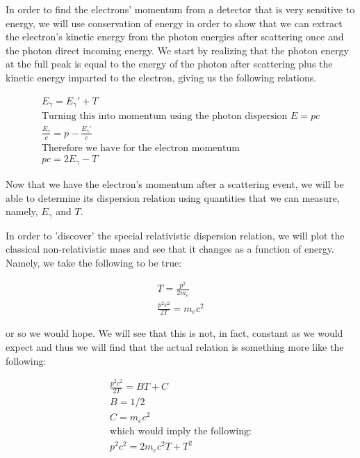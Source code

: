 \documentclass[reprint, nobibnotes, amssymb, amsmath, amsfonts, physics, mathtools, mathrsfs, floatfix]{revtex4-1}
\begin{document}
    In order to find the electrons' momentum from a detector that is very sensitive to energy, we will use conservation of energy in order to show that we can extract the electron's kinetic energy from the photon energies after scattering once and the photon direct incoming energy.  We start by realizing that the photon energy at the full peak is equal to the energy of the photon after scattering plus the kinetic energy imparted to the electron, giving us the following relations.

    \begin{gather}
      E_\gamma = E_\gamma ' + T \\
      \text{Turning this into momentum using the photon dispersion $E = pc$}\nonumber\\
      \frac{E_\gamma}{c} = p - \frac{E_\gamma '}{c} \\
      \text{Therefore we have for the electron momentum}\nonumber\\
      pc = 2E_\gamma - T
    \end{gather}

    Now that we have the electron's momentum after a scattering event, we will be able to determine its dispersion relation using quantities that we can measure, namely, $E_\gamma$ and $T$.

    \hspace{.25cm}

    In order to 'discover' the special relativistic dispersion relation, we will plot the classical non-relativistic mass and see that it changes as a function of energy.  Namely, we take the following to be true:

    \begin{gather}
      T = \frac{p^2}{2m_e} \\
      \frac{p^2c^2}{2T} = m_ec^2
    \end{gather}

    or so we would hope.  We will see that this is not, in fact, constant as we would expect and thus we will find that the actual relation is something more like the following:

    \begin{gather}
      \frac{p^2c^2}{2T} = BT + C \label{eq:fitfn} \\
      B = 1/2 \\
      C = m_ec^2 \\
      \text{which would imply the following:}\nonumber \\
      p^2c^2 = 2m_ec^2 T + T^2
    \end{gather}
\end{document}

